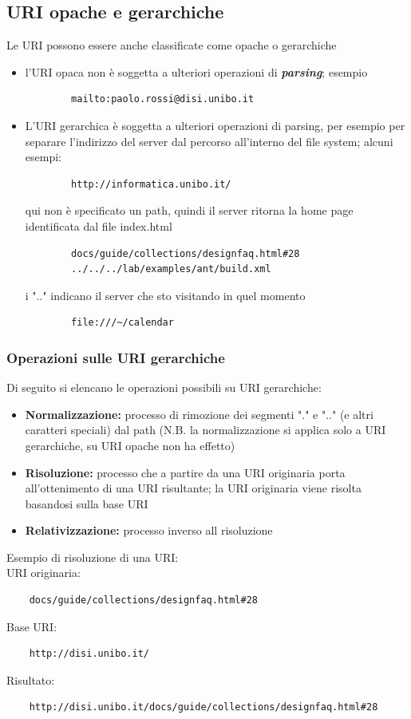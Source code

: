 \documentclass{article}
\begin{document}
\subsection{URI opache e gerarchiche}
Le URI possono essere anche classificate come opache o gerarchiche
\begin{itemize}
    \item l'URI opaca non è soggetta a ulteriori operazioni di \textbf{\textit{parsing}}; esempio
    \begin{verbatim}
        mailto:paolo.rossi@disi.unibo.it
    \end{verbatim}
    \item L'URI gerarchica è soggetta a ulteriori operazioni di parsing, per esempio per separare l'indirizzo del server dal percorso all'interno del file system; alcuni esempi:
    \begin{verbatim}
        http://informatica.unibo.it/
    \end{verbatim}
    qui non è specificato un path, quindi il server ritorna la home page identificata dal file {\selectfont index.html}
    \begin{verbatim}
        docs/guide/collections/designfaq.html#28
        ../../../lab/examples/ant/build.xml
    \end{verbatim}
    i {\selectfont ".."} indicano il server che sto visitando in quel momento
    \begin{verbatim}
        file:///~/calendar
    \end{verbatim}
\end{itemize}


\subsubsection{Operazioni sulle URI gerarchiche}
Di seguito si elencano le operazioni possibili su URI gerarchiche:
\begin{itemize}[label=$\blacktriangleright$]
    \item \textbf{Normalizzazione:} processo di rimozione dei segmenti {\selectfont "."} e {\selectfont ".."} (e altri caratteri speciali) dal path (N.B. la normalizzazione si applica solo a URI gerarchiche, su URI opache non ha effetto)
    \item \textbf{Risoluzione:} processo che a partire da una URI originaria porta all'ottenimento di una URI risultante; la URI originaria viene risolta basandosi sulla base URI
    \item \textbf{Relativizzazione:} processo inverso all risoluzione
\end{itemize}
Esempio di risoluzione di una URI:\\
URI originaria:
\begin{verbatim}
    docs/guide/collections/designfaq.html#28
\end{verbatim}
Base URI:
\begin{verbatim}
    http://disi.unibo.it/
\end{verbatim}
Risultato:
\begin{verbatim}
    http://disi.unibo.it/docs/guide/collections/designfaq.html#28
\end{verbatim}
\end{document}
